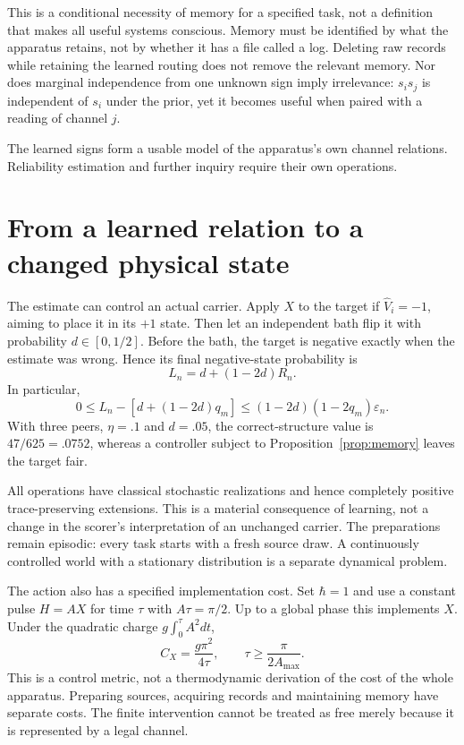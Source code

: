 \documentclass[11pt]{article}
\theoremstyle{definition}
\theoremstyle{remark}
\begin{document}
This is a conditional necessity of memory for a specified task, not a definition that makes all useful systems conscious. Memory must be identified by what the apparatus retains, not by whether it has a file called a log. Deleting raw records while retaining the learned routing does not remove the relevant memory. Nor does marginal independence from one unknown sign imply irrelevance: $s_is_j$ is independent of $s_i$ under the prior, yet it becomes useful when paired with a reading of channel $j$.

The learned signs form a usable model of the apparatus's own channel relations. Reliability estimation and further inquiry require their own operations.

\section{From a learned relation to a changed physical state}
\label{sec:action}

The estimate can control an actual carrier. Apply $X$ to the target if $\widehat V_i=-1$, aiming to place it in its $+1$ state. Then let an independent bath flip it with probability $d\in[0,1/2]$. Before the bath, the target is negative exactly when the estimate was wrong. Hence its final negative-state probability is
\begin{equation}
 L_n=d+(1-2d)R_n.
 \label{eq:world}
\end{equation}
In particular,
\begin{equation}
 0\le L_n-[d+(1-2d)q_m]
 \le(1-2d)(1-2q_m)\varepsilon_n.
\end{equation}
With three peers, $\eta=.1$ and $d=.05$, the correct-structure value is $47/625=.0752$, whereas a controller subject to Proposition~\ref{prop:memory} leaves the target fair.

All operations have classical stochastic realizations and hence completely positive trace-preserving extensions. This is a material consequence of learning, not a change in the scorer's interpretation of an unchanged carrier. The preparations remain episodic: every task starts with a fresh source draw. A continuously controlled world with a stationary distribution is a separate dynamical problem.

The action also has a specified implementation cost. Set $\hbar=1$ and use a constant pulse $H=A X$ for time $\tau$ with $A\tau=\pi/2$. Up to a global phase this implements $X$. Under the quadratic charge $g\int_0^\tau A^2dt$,
\begin{equation}
 C_X=\frac{g\pi^2}{4\tau},\qquad
 \tau\ge\frac{\pi}{2A_{\max}}.
\end{equation}
This is a control metric, not a thermodynamic derivation of the cost of the whole apparatus. Preparing sources, acquiring records and maintaining memory have separate costs. The finite intervention cannot be treated as free merely because it is represented by a legal channel.
\end{document}
